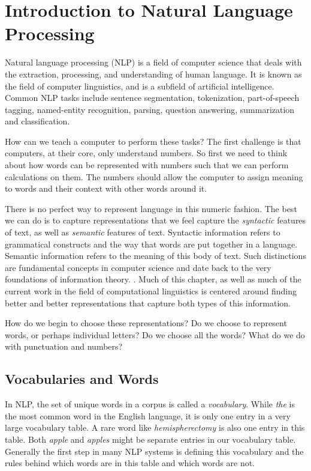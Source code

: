\section{Introduction to Natural Language Processing}

Natural language processing (NLP) is a field of computer science that deals with the extraction, processing, and understanding of human language.
It is known as the field of computer linguistics, and is a subfield of artificial intelligence.
Common NLP tasks include sentence segmentation, tokenization, part-of-speech tagging, named-entity recognition, parsing, question answering, summarization and classification.

How can we teach a computer to perform these tasks?
The first challenge is that computers, at their core, only understand numbers.
So first we need to think about how words can be represented with numbers such that we can perform calculations on them.
The numbers should allow the computer to assign meaning to words and their context with other words around it.

There is no perfect way to represent language in this numeric fashion. The best we can do is to capture representations that we feel capture the \textit{syntactic} features of text, as well as \textit{semantic} features of text.
Syntactic information refers to grammatical constructs and the way that words are put together in a language. Semantic information refers to the meaning of this body of text. Such distinctions are fundamental concepts in computer science
and date back to the very foundations of information theory. \cite{shannon48}. Much of this chapter, as well as much of the current work in the field of computational linguistics is centered around finding better and better representations that capture both types of this information.

How do we begin to choose these representations? Do we choose to represent words, or perhaps individual letters? Do we choose all the words? What do we do with punctuation and numbers?

\subsection{Vocabularies and Words}

In NLP, the set of unique words in a corpus is called a \textit{vocabulary}. While \textit{the} is the most common word in the English language, it is only one entry in a very large vocabulary table. A rare word like \textit{hemispherectomy} is also one
entry in this table. Both \textit{apple} and \textit{apples} might be separate entries in our vocabulary table. Generally the first step in many NLP systems is defining this vocabulary and the rules behind which words are in this table and which words are not.

